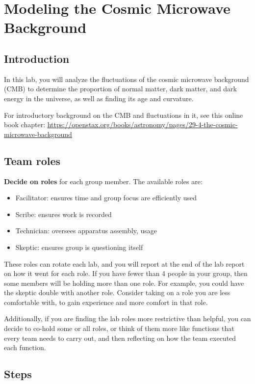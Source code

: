 \chapter{Modeling the Cosmic Microwave Background}

\section{Introduction}

In this lab, you will analyze the fluctuations of the cosmic microwave background (CMB) to determine the proportion of normal matter, dark matter, and dark energy in the universe, as well as finding its age and curvature.

For introductory background on the CMB and fluctuations in it, see this online book chapter: \url{https://openstax.org/books/astronomy/pages/29-4-the-cosmic-microwave-background}

\section{Team roles}

\textbf{Decide on roles} for each group member. The available roles are:

\begin{itemize}
	\item Facilitator: ensures time and group focus are efficiently used
	\item Scribe: ensures work is recorded
	\item Technician: oversees apparatus assembly, usage
	\item Skeptic: ensures group is questioning itself
\end{itemize}

These roles can rotate each lab, and you will report at the end of the lab report on how it went for each role. If you have fewer than 4 people in your group, then some members will be holding more than one role. For example, you could have the skeptic double with another role. Consider taking on a role you are less comfortable with, to gain experience and more comfort in that role.

Additionally, if you are finding the lab roles more restrictive than helpful, you can decide to co-hold some or all roles, or think of them more like functions that every team needs to carry out, and then reflecting on how the team executed each function.

\section{Steps}

